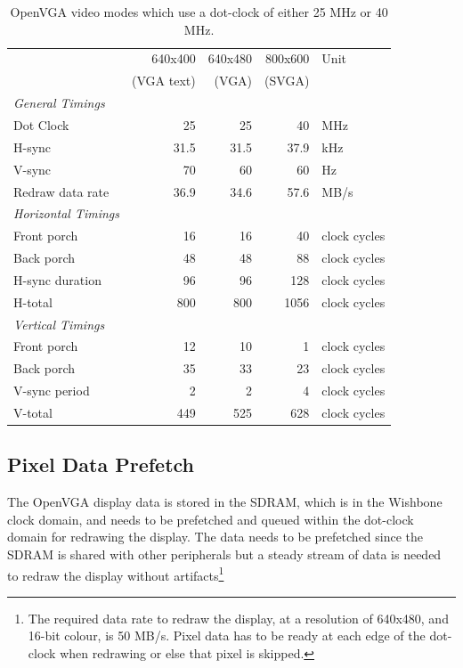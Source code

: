 \begin{table}[h!]
\begin{center}
\begin{tabular}{l r r r l}
				& 640x400	& 640x480	& 800x600	& Unit	\\
				& (VGA text)& (VGA)		& (SVGA)	&		\\
\hline
\textit{General Timings}	&	&	&	& \\
Dot Clock		&	25		&	25		&	40		& MHz	\\
H-sync			&	31.5	&	31.5	&	37.9	& kHz	\\
V-sync			&	70		&	60		&	60		& Hz	\\
Redraw data rate&	36.9	&	34.6	&	57.6	& MB/s	\\
\textit{Horizontal Timings}	&	&	&	& \\
Front porch		&	16		&	16		&	40		& clock cycles	\\
Back porch		&	48		&	48		&	88		& clock cycles	\\
H-sync duration	&	96		&	96		&	128		& clock cycles	\\
H-total			&	800		&	800		&	1056	& clock cycles	\\
\textit{Vertical Timings}	&	&	&	& \\
Front porch		&	12		&	10		&	1		& clock cycles	\\
Back porch		&	35		&	33		&	23		& clock cycles	\\
V-sync period	&	2		&	2		&	4		& clock cycles	\\
V-total			&	449		&	525		&	628		& clock cycles	\\
\end{tabular}
\end{center}
\caption[OpenVGA video modes]{OpenVGA video modes which use a dot-clock of
either 25 MHz or 40 MHz.}
\label{VIDEO_Modes_Table}
\end{table}

\subsection{Pixel Data Prefetch}
\label{VID_Prefetch}

The OpenVGA display data is stored in the SDRAM, which is in the Wishbone clock
domain, and needs to be prefetched and queued within the dot-clock domain for
redrawing the display. The data needs to be prefetched since the SDRAM is shared
with other peripherals but a steady stream of data is needed to redraw the
display without artifacts\footnote{The required data rate to redraw the display,
at a resolution of 640x480, and 16-bit colour, is 50 MB/s. Pixel data has to be
ready at each edge of the dot-clock when redrawing or else that pixel is
skipped.}

